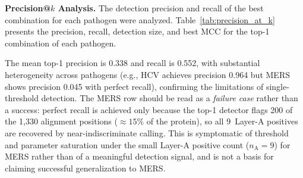 \textbf{Precision@$k$ Analysis.}
\label{subsec:precision_at_k}
The detection precision and recall of the best combination for each pathogen were analyzed. Table~\ref{tab:precision_at_k} presents the precision, recall, detection size, and best MCC for the top-1 combination of each pathogen.

\begin{table}[htbp]
\centering
\caption{Precision, recall, detection size, and best MCC of the top-1 combination for each pathogen (11 pathogens, 20 scoring types).}
\label{tab:precision_at_k}
\end{table}

The mean top-1 precision is 0.338 and recall is 0.552, with substantial heterogeneity across pathogens (e.g., HCV achieves precision 0.964 but MERS shows precision 0.045 with perfect recall), confirming the limitations of single-threshold detection. The MERS row should be read as a \emph{failure case} rather than a success: perfect recall is achieved only because the top-1 detector flags 200 of the 1{,}330 alignment positions ($\approx 15\%$ of the protein), so all 9~Layer-A positives are recovered by near-indiscriminate calling. This is symptomatic of threshold and parameter saturation under the small Layer-A positive count ($n_{\text{A}} = 9$) for MERS rather than of a meaningful detection signal, and is not a basis for claiming successful generalization to MERS.

